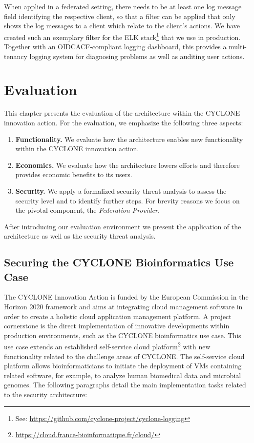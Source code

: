 \documentclass{llncs}
\begin{document}
When applied in a federated setting, there needs to be at least one log message field identifying the respective client, so that a filter can be applied that only shows the log messages to a client which relate to the client's actions. We have created such an exemplary filter for the ELK stack\footnote{See: \url{https://github.com/cyclone-project/cyclone-logging}} that we use in production. Together with an OIDCACF-compliant logging dashboard, this provides a multi-tenancy logging system for diagnosing problems as well as auditing user actions.

\section{Evaluation}
\label{sec:evaluation}

This chapter presents the evaluation of the architecture within the CYCLONE innovation action. For the evaluation, we emphasize the following three aspects:

\begin{enumerate}
	\item \textbf{Functionality.} We evaluate how the architecture enables new functionality within the CYCLONE innovation action.
	
	\item \textbf{Economics.} We evaluate how the architecture lowers efforts and therefore provides economic benefits to its users.
	
	\item \textbf{Security.} We apply a formalized security threat analysis to assess the security level and to identify further steps. For brevity reasons we focus on the pivotal component, the \textit{Federation Provider}.
\end{enumerate}

After introducing our evaluation environment we present the application of the architecture as well as the security threat analysis.

\subsection{Securing the CYCLONE Bioinformatics Use Case}

The CYCLONE Innovation Action is funded by the European Commission in the Horizon 2020 framework and aims at integrating cloud management software in order to create a holistic cloud application management platform. A project cornerstone is the direct implementation of innovative developments within production environments, such as the CYCLONE bioinformatics use case. This use case extends an established self-service cloud platform\footnote{\url{https://cloud.france-bioinformatique.fr/cloud/}} with new functionality related to the challenge areas of CYCLONE. The self-service cloud platform allows bioinformaticians to initiate the deployment of VMs containing related software, for example, to analyze human biomedical data and microbial genomes. The following paragraphs detail the main implementation tasks related to the security architecture:
\end{document}
